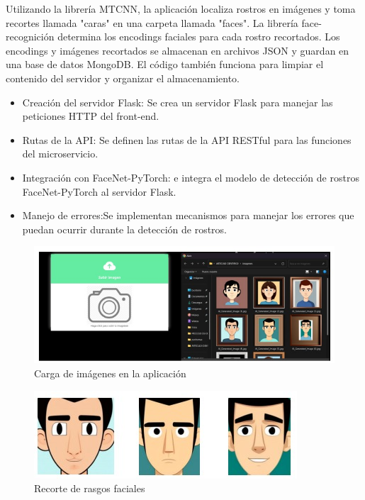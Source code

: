 \documentclass[12pt]{article}
\begin{document}
Utilizando la librería MTCNN, la aplicación localiza rostros en imágenes y toma recortes llamada "caras" en una carpeta llamada "faces". La librería face-recognición determina los encodings faciales para cada rostro recortados. Los encodings y imágenes recortados se almacenan en archivos JSON y guardan en una base de datos MongoDB. El código también funciona para limpiar el contenido del servidor y organizar el almacenamiento.
\begin{itemize}
    \item Creación del servidor Flask: Se crea un servidor Flask para manejar las peticiones HTTP del front-end.
    \item Rutas de la API: Se definen las rutas de la API RESTful para las funciones del microservicio.
    \item Integración con FaceNet-PyTorch: e integra el modelo de detección de rostros FaceNet-PyTorch al servidor Flask.
    \item Manejo de errores:Se implementan mecanismos para manejar los errores que puedan ocurrir durante la detección de rostros.
\end{itemize}
\begin{figure}
    \centering
    \includegraphics[width=0.7\linewidth]{figura 3.jpeg}
    \caption{Carga de imágenes en la aplicación}
    \label{fig:enter-label}
\end{figure}
\begin{figure}
    \centering
    \includegraphics[width=0.7\linewidth]{figura 2.jpeg}
    \caption{Recorte de rasgos faciales}
    \label{fig:enter-label}
\end{figure}
\end{document}
